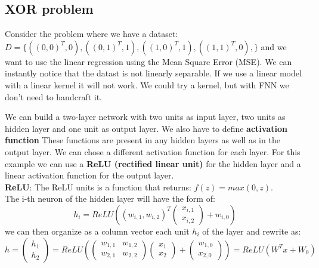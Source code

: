 \subsection{XOR problem}
Consider the problem where we have a dataset: $D=\{((0, 0)^{T}, 0), ((0, 1)^{T}, 1), ((1, 0)^{T}, 1), ((1, 1)^{T}, 0),\}$ and we want to use the linear regression using the Mean Square Error (MSE). We can instantly notice that the datast is not linearly separable. If we use a linear model with a linear kernel it will not work. We could try a kernel, but with FNN we don't need to handcraft it.

We can build a two-layer network with two units as input layer, two units as hidden layer and one unit as output layer. We also have to define \textbf{activation function} These functions are present in any hidden layers as well as in the output layer. We can chose a different activation function for each layer. For this example we can use a \textbf{ReLU (rectified linear unit)} for the hidden layer and a linear activation function for the output layer.\\
\textbf{ReLU}: The ReLU units is a function that returns: $f(z)= max(0, z)$.\\
The i-th neuron of the hidden layer will have the form of:
\begin{equation}
    h_{i} = ReLU\left((w_{i,1}, w_{i,2})^{T} \begin{pmatrix} x_{i,1} \\ x_{i,2} \end{pmatrix} + w_{i,0}\right)
\end{equation}
we can then organize as a column vector each unit $h_{i}$ of the layer and rewrite as:
\begin{equation}
    h = \begin{pmatrix} h_{1} \\ h_{2}  \end{pmatrix} = ReLU\left(\begin{pmatrix} w_{1,1} & w_{1,2} \\ w_{2,1} & w_{2,2} \end{pmatrix} \begin{pmatrix}
        x_{1} \\ x_{2}
    \end{pmatrix} + \begin{pmatrix}  w_{1,0} \\ x_{2,0}
    \end{pmatrix}\right) = ReLU\left( W^{T}x + W_{0} \right)
\end{equation}

